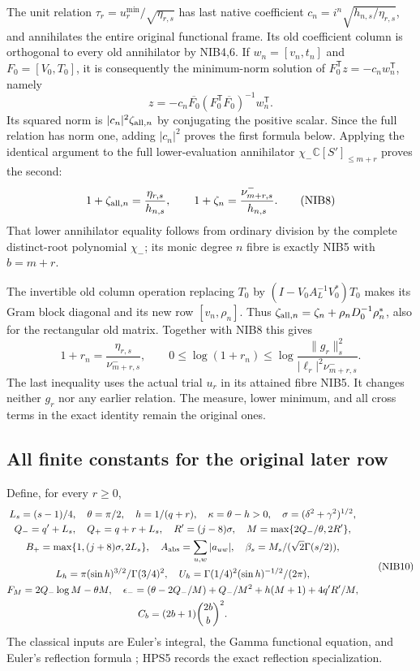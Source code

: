 \documentclass[11pt,a4paper]{article}
\begin{document}
The unit relation $\tau_r=u_r^{\min}/\sqrt{\eta_{r,s}}$
has last native coefficient
$c_n=i^n\sqrt{h_{n,s}/\eta_{r,s}}$, and annihilates the entire
original functional frame. Its old coefficient column is
orthogonal to every old annihilator by NIB4,6. If
$w_n=[v_n,t_n]$ and $F_0=[V_0,T_0]$, it is consequently the
minimum-norm solution of
$F_0^{\mathsf T}z=-c_nw_n^{\mathsf T}$, namely
\[
 z=-c_n\overline{F_0}(F_0^{\mathsf T}\overline{F_0})^{-1}
                                                  w_n^{\mathsf T}.
\]
Its squared norm is $|c_n|^2\zeta_{{\rm all},n}$ by
conjugating the positive scalar. Since the full relation has
norm one, adding $|c_n|^2$ proves the first formula below.
Applying the identical argument to the full lower-evaluation
annihilator $\chi_-\mathbb C[S']_{\le m+r}$ proves the second:
\[
 1+\zeta_{{\rm all},n}=\frac{\eta_{r,s}}{h_{n,s}},\qquad
 1+\zeta_n=\frac{\nu_{m+r,s}^-}{h_{n,s}}.                 \tag{NIB8}
\]
That lower annihilator equality follows from ordinary division by
the complete distinct-root polynomial $\chi_-$; its monic degree
$n$ fibre is exactly NIB5 with $b=m+r$.

The invertible old column operation replacing $T_0$ by
$(I-V_0A_L^{-1}V_0^*)T_0$ makes its Gram block diagonal and its
new row $[v_n,\rho_n]$. Thus
$\zeta_{{\rm all},n}=\zeta_n+\rho_nD_0^{-1}\rho_n^*$,
also for the rectangular old matrix. Together with NIB8 this gives
\[
 \boxed{\quad
 1+r_n=\frac{\eta_{r,s}}{\nu_{m+r,s}^-},\qquad
 0\le\log(1+r_n)
       \le\log\frac{\|g_r\|_s^2}
                         {|\ell_r|^2\nu_{m+r,s}^-}.
 \quad}                                                         \tag{NIB9}
\]
The last inequality uses the actual trial $u_r$ in its attained
fibre NIB5. It changes neither $g_r$ nor any earlier relation.
The measure, lower minimum, and all cross terms in the exact
identity remain the original ones.

\subsection{All finite constants for the original later row}
Define, for every $r\ge0$,
\[
\begin{gathered}
 L_s=(s-1)/4,\quad \theta=\pi/2,\quad h=1/(q+r),\quad
 \kappa=\theta-h>0,\quad \sigma=(\delta^2+\gamma^2)^{1/2},\\
 Q_-=q'+L_s,\quad Q_+=q+r+L_s,\quad R'=(j-8)\sigma,
 \quad M=\max\{2Q_-/\theta,2R'\},\\
 B_+=\max\{1,(j+8)\sigma,2L_s\},\quad
 A_{\rm abs}=\sum_{u,w}|a_{uw}|,\quad
 \beta_s=M_s/(\sqrt2\Gamma(s/2)),\\
 L_h=\pi(\sin h)^{3/2}/\Gamma(3/4)^2,\quad
 U_h=\Gamma(1/4)^2(\sin h)^{-1/2}/(2\pi),\\
 F_M=2Q_-\log M-\theta M,\quad
 \epsilon_-=(\theta-2Q_-/M)+Q_-/M^2+h(M+1)+4q'R'/M,\\
 C_b=(2b+1)\binom{2b}{b}^{2}.
\end{gathered}                                                     \tag{NIB10}
\]
The classical inputs are Euler's integral, the Gamma functional equation, and Euler's reflection formula \cite[eqs.~(5.2.1), (5.5.1), (5.5.3)]{human:dlmf5}; HPS5 records the exact reflection specialization.
\end{document}
